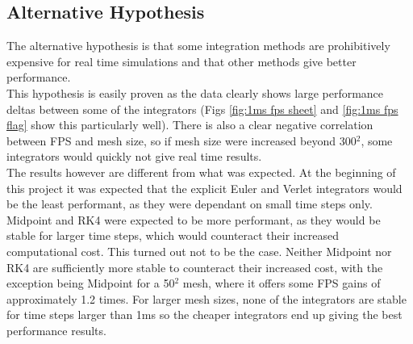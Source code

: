 \subsection{Alternative Hypothesis}
The alternative hypothesis is that some integration methods are prohibitively expensive for real time simulations and that other methods give better performance.
\\This hypothesis is easily proven as the data clearly shows large performance deltas between some of the integrators (Figs \ref{fig:1ms fps sheet} and \ref{fig:1ms fps flag} show this particularly well). There is also a clear negative correlation between FPS and mesh size, so if mesh size were increased beyond 300$^{2}$, some integrators would quickly not give real time results.
\\The results however are different from what was expected. At the beginning of this project it was expected that the explicit Euler and Verlet integrators would be the least performant, as they were dependant on small time steps only. Midpoint and RK4 were expected to be more performant, as they would be stable for larger time steps, which would counteract their increased computational cost. This turned out not to be the case. Neither Midpoint nor RK4 are sufficiently more stable to counteract their increased cost, with the exception being Midpoint for a 50$^{2}$ mesh, where it offers some FPS gains of approximately 1.2 times. For larger mesh sizes, none of the integrators are stable for time steps larger than 1ms so the cheaper integrators end up giving the best performance results.